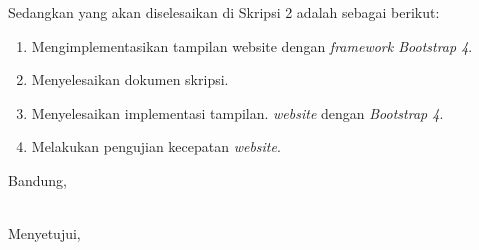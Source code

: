 \documentclass[a4paper,twoside]{article}
\begin{document}
Sedangkan yang akan diselesaikan di Skripsi 2 adalah sebagai berikut:
\begin{enumerate}
\item Mengimplementasikan tampilan website dengan \textit{framework Bootstrap 4}.
\item Menyelesaikan dokumen skripsi.
\item Menyelesaikan implementasi tampilan. \textit{website} dengan \textit{Bootstrap 4}.
\item Melakukan pengujian kecepatan \textit{website}.
\end{enumerate}

\vspace{1cm}
\centering Bandung, \tanggal\\
\vspace{2cm} \nama \\ 
\vspace{1cm}

Menyetujui, \\
\end{document}
